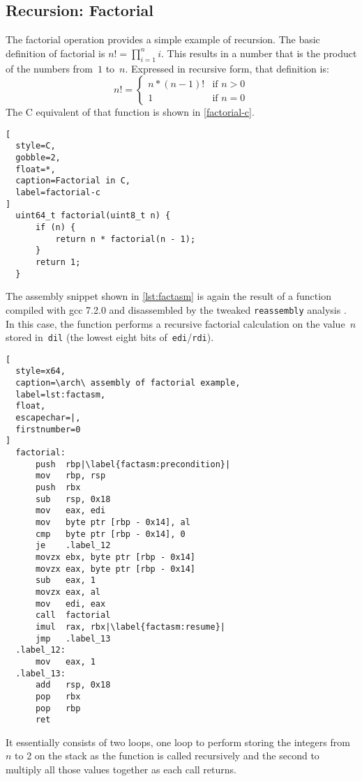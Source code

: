 \subsection{Recursion: Factorial}\label{sse:factorial_example}
The factorial operation provides a simple example of recursion.%
%
The basic definition of factorial is $n!=\prod_{i=1}^n i$.%
This results in a number that is the product of the numbers from~$1$ to~$n$.
Expressed in recursive form, that definition is:
\begin{equation}
  n!=\begin{cases}
    n * (n - 1)! & \text{if }n > 0 \\
    1 & \text{if }n = 0
  \end{cases}
\end{equation}
The C equivalent of that function is shown in \cref{factorial-c}.
\begin{lstlisting}[
  style=C,
  gobble=2,
  float=*,
  caption=Factorial in C,
  label=factorial-c
]
  uint64_t factorial(uint8_t n) {
      if (n) {
          return n * factorial(n - 1);
      }
      return 1;
  }
\end{lstlisting}
The assembly snippet shown in \cref{lst:factasm} is again
the result of a function compiled with \ac{gcc} 7.2.0
and disassembled by the tweaked \lstinline|reassembly| analysis \autocite{wang2017ramblr}.
In this case, the function performs a recursive factorial calculation on the value~$n$
stored in~\lstinline|dil| (the lowest eight bits of~\lstinline|edi|/\lstinline|rdi|).
\begin{lstlisting}[
  style=x64,
  caption=\arch\ assembly of factorial example,
  label=lst:factasm,
  float,
  escapechar=|,
  firstnumber=0
]
  factorial:
      push  rbp|\label{factasm:precondition}|
      mov   rbp, rsp
      push  rbx
      sub   rsp, 0x18
      mov   eax, edi
      mov   byte ptr [rbp - 0x14], al
      cmp   byte ptr [rbp - 0x14], 0
      je    .label_12
      movzx ebx, byte ptr [rbp - 0x14]
      movzx eax, byte ptr [rbp - 0x14]
      sub   eax, 1
      movzx eax, al
      mov   edi, eax
      call  factorial
      imul  rax, rbx|\label{factasm:resume}|
      jmp   .label_13
  .label_12:
      mov   eax, 1
  .label_13:
      add   rsp, 0x18
      pop   rbx
      pop   rbp
      ret
\end{lstlisting}
It essentially consists of two loops,
one loop to perform storing the integers from~$n$ to 2 on the stack as the function
is called recursively
and the second to multiply all those values together as each call returns.

